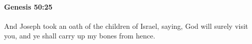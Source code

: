 
		\paragraph{Genesis 50:25} %
			\label{GENESIS-50-25}

			And Joseph took an oath of the children of Israel, saying, God will surely visit you, and ye shall carry up my bones from hence.


